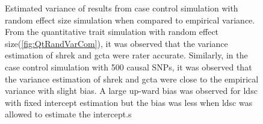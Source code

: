 \begin{figure}
{				
				\label{fig:ldscInCC50RandVarCom}
			}
			\caption[Case Control with Random Effect Size Simulation Result(Estimated Variance)]
			{Estimated variance of results from case control simulation with random effect size simulation when compared to empirical variance.
				From the quantitative trait simulation with random effect size(\cref{fig:QtRandVarCom}), it was observed that the variance estimation of \gls{shrek} and \gls{gcta} were rater accurate.
				Similarly, in the case control simulation with 500 causal \glspl{SNP}, it was observed that the variance estimation of \gls{shrek} and \gls{gcta} were close to the empirical variance with slight bias.
				A large up-ward bias was observed for \gls{ldsc} with fixed intercept estimation but the bias was less when \gls{ldsc} was allowed to estimate the intercept.s
			} 
			\label{fig:CC50RandVarCom}
		\end{figure}